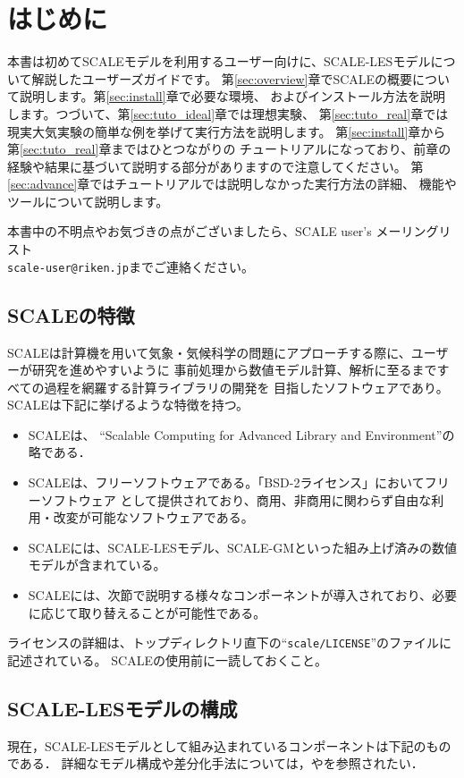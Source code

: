 \section{はじめに}

本書は初めてSCALEモデルを利用するユーザー向けに、SCALE-LESモデルについて解説したユーザーズガイドです。
第\ref{sec:overview}章でSCALEの概要について説明します。第\ref{sec:install}章で必要な環境、
およびインストール方法を説明します。つづいて、第\ref{sec:tuto_ideal}章では理想実験、
第\ref{sec:tuto_real}章では現実大気実験の簡単な例を挙げて実行方法を説明します。
第\ref{sec:install}章から第\ref{sec:tuto_real}章まではひとつながりの
チュートリアルになっており、前章の経験や結果に基づいて説明する部分がありますので注意してください。
第\ref{sec:advance}章ではチュートリアルでは説明しなかった実行方法の詳細、
機能やツールについて説明します。

本書中の不明点やお気づきの点がございましたら、SCALE user's メーリングリスト\\
 \verb|scale-user@riken.jp|までご連絡ください。



\subsection{SCALEの特徴}
SCALEは計算機を用いて気象・気候科学の問題にアプローチする際に、ユーザーが研究を進めやすいように
事前処理から数値モデル計算、解析に至るまですべての過程を網羅する計算ライブラリの開発を
目指したソフトウェアであり。SCALEは下記に挙げるような特徴を持つ。
\begin{itemize}
\item SCALEは、 ``Scalable Computing for Advanced Library and Environment''の略である．
\item SCALEは、フリーソフトウェアである。「BSD-2ライセンス」においてフリーソフトウェア
として提供されており、商用、非商用に関わらず自由な利用・改変が可能なソフトウェアである。
\item SCALEには、SCALE-LESモデル、SCALE-GMといった組み上げ済みの数値モデルが含まれている。
\item SCALEには、次節で説明する様々なコンポーネントが導入されており、必要に応じて取り替えることが可能性である。
\end{itemize}

ライセンスの詳細は、トップディレクトリ直下の``\verb|scale/LICENSE|''のファイルに記述されている。
SCALEの使用前に一読しておくこと。

\subsection{SCALE-LESモデルの構成}
現在，SCALE-LESモデルとして組み込まれているコンポーネントは下記のものである．
詳細なモデル構成や差分化手法については，\cite{scale_2015}や\cite{nishizawa_2015}を参照されたい．\\

